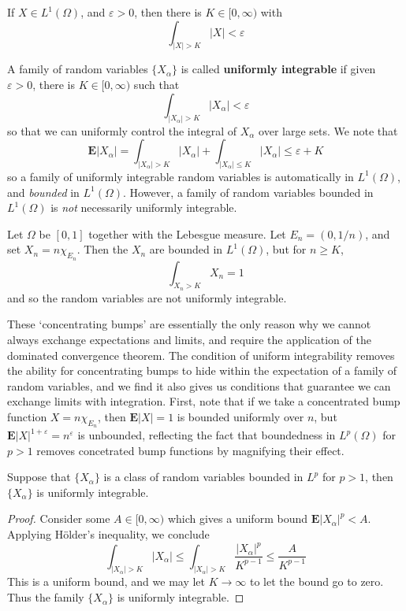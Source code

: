 \begin{corollary}
    If $X \in L^1(\Omega)$, and $\varepsilon > 0$, then there is $K \in [0,\infty)$ with
    \[ \int_{|X| > K} |X| < \varepsilon \]
\end{corollary}

A family of random variables $\{ X_\alpha \}$ is called {\bf uniformly integrable} if given $\varepsilon > 0$, there is $K \in [0,\infty)$ such that
%
\[ \int_{|X_\alpha| > K} |X_\alpha| < \varepsilon \]
%
so that we can uniformly control the integral of $X_\alpha$ over large sets. We note that
%
\[ \mathbf{E} |X_\alpha| = \int_{|X_\alpha| > K} |X_\alpha| + \int_{|X_\alpha| \leq K} |X_\alpha| \leq \varepsilon + K \]
%
so a family of uniformly integrable random variables is automatically in $L^1(\Omega)$, and {\it bounded} in $L^1(\Omega)$. However, a family of random variables bounded in $L^1(\Omega)$ is {\it not} necessarily uniformly integrable.

\begin{example}
    Let $\Omega$ be $[0,1]$ together with the Lebesgue measure. Let $E_n = (0,1/n)$, and set $X_n = n \chi_{E_n}$. Then the $X_n$ are bounded in $L^1(\Omega)$, but for $n \geq K$,
    \[ \int_{X_n > K} X_n = 1 \]
    and so the random variables are not uniformly integrable.
\end{example}

These `concentrating bumps' are essentially the only reason why we cannot always exchange expectations and limits, and require the application of the dominated convergence theorem. The condition of uniform integrability removes the ability for concentrating bumps to hide within the expectation of a family of random variables, and we find it also gives us conditions that guarantee we can exchange limits with integration. First, note that if we take a concentrated bump function $X = n \chi_{E_n}$, then $\mathbf{E}|X| = 1$ is bounded uniformly over $n$, but $\mathbf{E}|X|^{1+\varepsilon} = n^\varepsilon$ is unbounded, reflecting the fact that boundedness in $L^p(\Omega)$ for $p > 1$ removes concetrated bump functions by magnifying their effect.

\begin{theorem}
    Suppose that $\{ X_\alpha \}$ is a class of random variables bounded in $L^p$ for $p > 1$, then $\{ X_\alpha \}$ is uniformly integrable.
\end{theorem}
\begin{proof}
    Consider some $A \in [0,\infty)$ which gives a uniform bound $\mathbf{E} |X_\alpha|^p < A$. Applying H\"{o}lder's inequality, we conclude
    \[ \int_{|X_\alpha| > K} |X_\alpha| \leq \int_{|X_\alpha| > K} \frac{|X_\alpha|^p}{K^{p-1}} \leq \frac{A}{K^{p-1}} \]
    This is a uniform bound, and we may let $K \to \infty$ to let the bound go to zero. Thus the family $\{ X_\alpha \}$ is uniformly integrable.
\end{proof}

